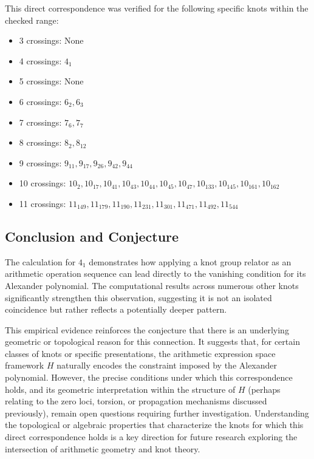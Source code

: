 \documentclass{article}[a4paper,12pt]
\begin{document}
This direct correspondence was verified for the following specific knots within the checked range:
\begin{itemize}
    \item 3 crossings: None
    \item 4 crossings: $4_1$
    \item 5 crossings: None
    \item 6 crossings: $6_2, 6_3$
    \item 7 crossings: $7_6, 7_7$
    \item 8 crossings: $8_2, 8_{12}$
    \item 9 crossings: $9_{11}, 9_{17}, 9_{26}, 9_{42}, 9_{44}$
    \item 10 crossings: $10_2, 10_{17}, 10_{41}, 10_{43}, 10_{44}, 10_{45}, 10_{47}, 10_{133}, 10_{145}, 10_{161}, 10_{162}$
    \item 11 crossings: $11_{149}, 11_{179}, 11_{190}, 11_{231}, 11_{301}, 11_{471}, 11_{492}, 11_{544}$
\end{itemize}

\subsection{Conclusion and Conjecture}

The calculation for $4_1$ demonstrates how applying a knot group relator as an arithmetic operation sequence can lead directly to the vanishing condition for its Alexander polynomial. The computational results across numerous other knots significantly strengthen this observation, suggesting it is not an isolated coincidence but rather reflects a potentially deeper pattern.

This empirical evidence reinforces the conjecture that there is an underlying geometric or topological reason for this connection. It suggests that, for certain classes of knots or specific presentations, the arithmetic expression space framework $H$ naturally encodes the constraint imposed by the Alexander polynomial. However, the precise conditions under which this correspondence holds, and its geometric interpretation within the structure of $H$ (perhaps relating to the zero loci, torsion, or propagation mechanisms discussed previously), remain open questions requiring further investigation. Understanding the topological or algebraic properties that characterize the knots for which this direct correspondence holds is a key direction for future research exploring the intersection of arithmetic geometry and knot theory.
\end{document}
